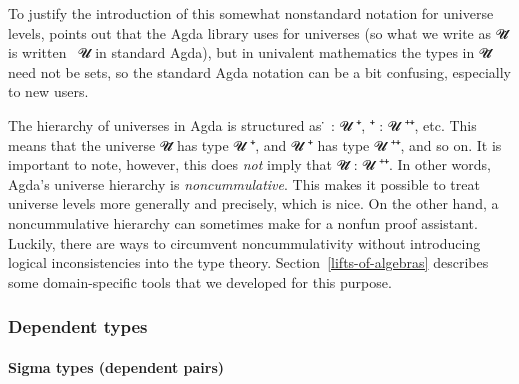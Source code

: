 To justify the introduction of this somewhat nonstandard notation for universe levels, \escardo points out that the Agda library uses  for universes (so what we write as \ab 𝓤\af ̇ is written ~\ab 𝓤 in standard Agda), but in univalent mathematics the types in \ab 𝓤\af ̇ need not be sets, so the standard Agda notation can be a bit confusing, especially to new users.


The hierarchy of universes in Agda is structured as \af ̇ \as : \ab 𝓤 \af ⁺\af ̇, \hskip3mm
 \af ⁺\af ̇ \as : \ab 𝓤 \af ⁺\af ⁺\af ̇, etc. This means that the universe \ab 𝓤\af ̇ has type \ab 𝓤  \af ⁺\af ̇, and 𝓤 \af ⁺\af ̇ has type \ab 𝓤 \af ⁺\af ⁺\af ̇, and so on.  It is important to note, however, this does \emph{not} imply that \ab 𝓤\af ̇ \as : \ab 𝓤 \af ⁺\af ⁺\af ̇. In other words, Agda's universe hierarchy is \emph{noncummulative}. This makes it possible to treat universe levels more generally and precisely, which is nice. On the other hand, a noncummulative hierarchy can sometimes make for a nonfun proof assistant. Luckily, there are ways to circumvent noncummulativity without introducing logical inconsistencies into the type theory. Section~\ref{lifts-of-algebras} describes some domain-specific tools that we developed for this purpose.








\subsubsection{Dependent types}\label{sec:dependent-types}

\newcommand\FstUnder{\AgdaOperator{\AgdaFunction{∣\AgdaUnderscore{}∣}}\xspace}
\newcommand\SndUnder{\AgdaOperator{\AgdaFunction{∥\AgdaUnderscore{}∥}}\xspace}








\paragraph*{Sigma types (dependent pairs)} %


